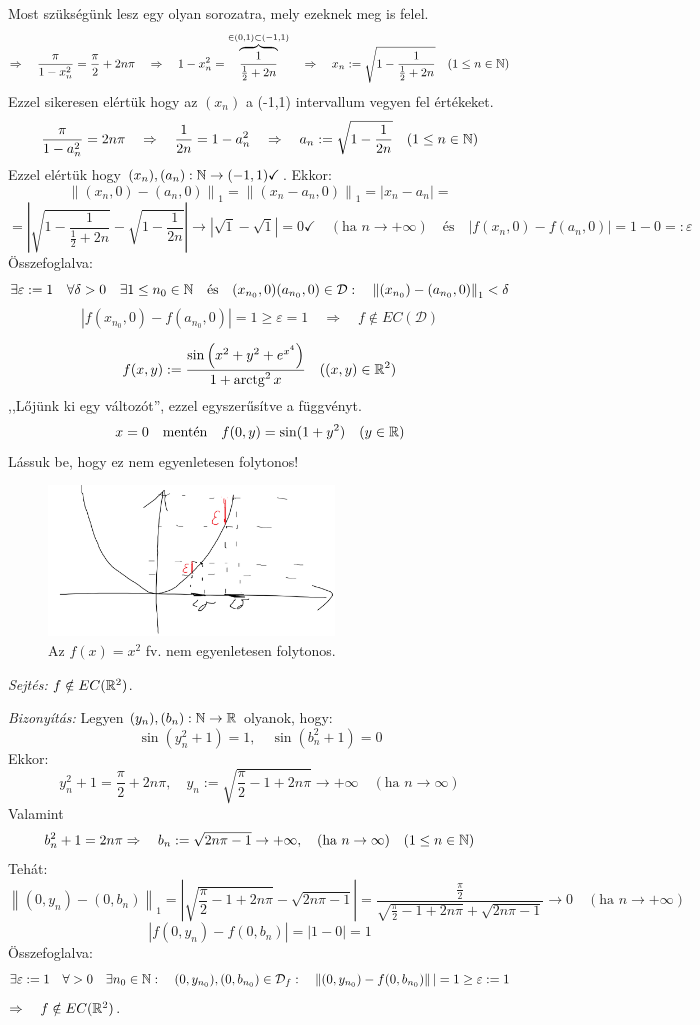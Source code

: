 \documentclass[a4paper,11.5pt]{article}
\DeclareMathOperator{\arctg}{arc tg}
\newcommand{\norm}[1]{\left\lVert#1\right\rVert}
\begin{document}
\begin{task}
		Most szükségünk lesz egy olyan sorozatra, mely ezeknek meg is felel.
		\[ \Rightarrow\quad \frac{\pi}{1-x_n^2}=\frac{\pi}{2}+2n\pi \quad \Rightarrow\quad 1-x_n^2=\overbrace{\frac{1}{\frac{1}{2}+2n}}^{\in(0,1)\subset(-1,1)}\quad \Rightarrow\quad x_n:=\sqrt{1-\frac{1}{\frac{1}{2}+2n}}\quad (1\leq n\in\mathbb{N})  \]
		Ezzel sikeresen elértük hogy az $(x_n)$ a (-1,1) intervallum vegyen fel értékeket.
		\[ \frac{\pi}{1-a_n^2}=2n\pi\quad \Rightarrow\quad \frac{1}{2n}=1-a_n^2\quad \Rightarrow\quad a_n:=\sqrt{1-\frac{1}{2n}}\quad (1\leq n\in\mathbb{N}) \]
		Ezzel elértük hogy $(x_n),(a_n):\mathbb{N}\to(-1,1)\checkmark$. Ekkor:
		\[ \norm{(x_n,0)-(a_n,0)}_1=\norm{(x_n-a_n,0)}_1=|x_n-a_n|=\]
		\[=\left|\sqrt{1-\frac{1}{\frac{1}{2}+2n}}-\sqrt{1-\frac{1}{2n}}\right|\to|\sqrt{1}-\sqrt{1}|=0\checkmark\quad (\text{ha } n\to+\infty )\quad \text{és}\quad |f(x_n,0)-f(a_n,0)|=1-0=:\varepsilon \]
		Összefoglalva:
		\[ \exists\varepsilon:=1\quad \forall\delta>0\quad \exists1\leq n_0\in\N\quad \text{és}\quad (x_{n_0},0)(a_{n_0},0)\in \mathcal{D}:\quad \norm{(x_{n_0})-(a_{n_0},0)}_1<\delta\]
		\[ |f(x_{n_0},0)-f(a_{n_0},0)|=1 \geq\varepsilon=1\quad \Rightarrow\quad f\notin EC(\mathcal{D}) \]
		
	\end{task}
	\begin{task}
		\[ f(x,y):=\frac{\sin\left(x^2+y^2+e^{x^4}\right)}{1+\arctg^2x}\quad ((x,y)\in\R^2) \]
		,,Lőjünk ki egy változót'', ezzel egyszerűsítve a függvényt.
		\[ x=0\quad \text{mentén}\quad f(0,y)=\sin(1+y^2)\quad (y\in\mathbb{R}) \]
		Lássuk be, hogy ez nem egyenletesen folytonos!
		
		\begin{figure}[H]
			\centering
			\includegraphics[height=4cm]{../2zh/kepek/54.png}
			\caption{Az $f(x)=x^2$ fv. nem egyenletesen folytonos.}
		\end{figure}
		
		\textit{Sejtés:} $f\notin EC(\mathbb{R}^2)$.
		
		\textit{Bizonyítás:} Legyen $(y_n),(b_n):\mathbb{N}\to\mathbb{R}$ olyanok, hogy:
		\[ \sin(y_n^2+1)=1,\quad \sin(b_n^2+1)=0 \]
		Ekkor:
		\[ y_n^2+1=\frac{\pi}{2}+2n\pi,\quad y_n:=\sqrt{\frac{\pi}{2}-1+2n\pi}\to+\infty\quad (\text{ha }n\to\infty) \]
		Valamint
		\[ b_n^2+1=2n\pi\Rightarrow\quad b_n:=\sqrt{2n\pi-1}\to+\infty,\quad (\text{ha } n\to\infty)\quad (1\leq n\in\mathbb{N}) \]
		Tehát:
		\[ \norm{(0,y_n)-(0,b_n)}_1=\left|\sqrt{\frac{\pi}{2}-1+2n\pi}-\sqrt{2n\pi-1}\right|=\frac{\frac{\pi}{2}}{\sqrt{\frac{\pi}{2}-1+2n\pi}+\sqrt{2n\pi-1}}\to0\quad (\text{ha }n\to+\infty) \]
		\[ |f(0,y_n)-f(0,b_n)|=|1-0|=1 \]
		Összefoglalva:
		\[ \exists\varepsilon:=1\quad \forall>0\quad \exists n_0\in\N:\quad (0,y_{n_0}),(0,b_{n_0})\in\mathcal{D}_f:\quad \norm{(0,y_{n_0})-f(0,b_{n_0})}|=1\geq\varepsilon:=1 \]
		$\Rightarrow\quad f\notin EC(\mathbb{R}^2)$.
	\end{task}
\end{document}
